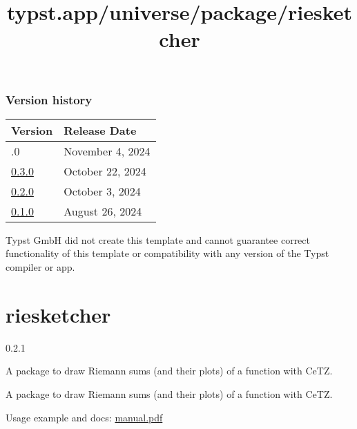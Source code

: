 \label{versions}
\subsubsection{Version history}\label{version-history}

\begin{longtable}[]{@{}ll@{}}
\toprule\noalign{}
Version & Release Date \\
\midrule\noalign{}
\endhead
\bottomrule\noalign{}
\endlastfoot
0.4.0 & November 4, 2024 \\
\href{https://typst.app/universe/package/orange-book/0.3.0/}{0.3.0} &
October 22, 2024 \\
\href{https://typst.app/universe/package/orange-book/0.2.0/}{0.2.0} &
October 3, 2024 \\
\href{https://typst.app/universe/package/orange-book/0.1.0/}{0.1.0} &
August 26, 2024 \\
\end{longtable}

Typst GmbH did not create this template and cannot guarantee correct
functionality of this template or compatibility with any version of the
Typst compiler or app.


\title{typst.app/universe/package/riesketcher}

\label{banner}
\section{riesketcher}\label{riesketcher}

{ 0.2.1 }

A package to draw Riemann sums (and their plots) of a function with
CeTZ.

\label{readme}
A package to draw Riemann sums (and their plots) of a function with
CeTZ.

Usage example and docs:
\href{https://github.com/ThatOneCalculator/riesketcher/blob/main/manual.pdf}{manual.pdf}

\begin{Shaded}
\begin{Highlighting}[]
\end{Highlighting}
\end{Shaded}


